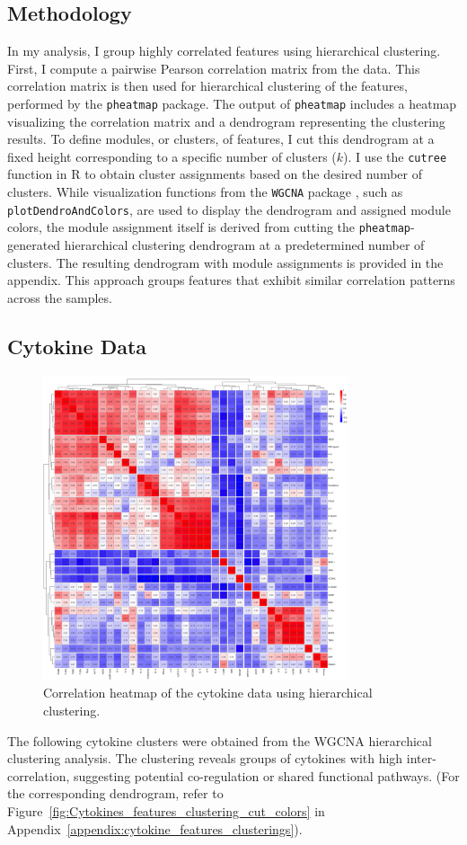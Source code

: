 \documentclass[12pt,a4paper]{report}
\begin{document}
\subsection{Methodology}
\noindent
In my analysis, I group highly correlated features using hierarchical clustering. First, I compute a pairwise Pearson correlation matrix from the data. This correlation matrix is then used for hierarchical clustering of the features, performed by the \texttt{pheatmap} package. The output of \texttt{pheatmap} includes a heatmap visualizing the correlation matrix and a dendrogram representing the clustering results. To define modules, or clusters, of features, I cut this dendrogram at a fixed height corresponding to a specific number of clusters ($k$). I use the \texttt{cutree} function in R to obtain cluster assignments based on the desired number of clusters. While visualization functions from the \texttt{WGCNA} package \cite{WGCNA}, such as \texttt{plotDendroAndColors}, are used to display the dendrogram and assigned module colors, the module assignment itself is derived from cutting the \texttt{pheatmap}-generated hierarchical clustering dendrogram at a predetermined number of clusters. The resulting dendrogram with module assignments is provided in the appendix. This approach groups features that exhibit similar correlation patterns across the samples.

\subsection{Cytokine Data}
\begin{figure}[h!]
  \centering
  \includegraphics[width=0.8\textwidth]{images/Cytokine_euclidean_distance.png}
  \caption[cytokines data correlations]{Correlation heatmap of the cytokine data using hierarchical clustering.}
  \label{fig:cytokine_heatmap}
\end{figure}
\noindent
The following cytokine clusters were obtained from the WGCNA hierarchical clustering analysis. The clustering reveals groups of cytokines with high inter-correlation, suggesting potential co-regulation or shared functional pathways. (For the corresponding dendrogram, refer to Figure~\ref{fig:Cytokines_features_clustering_cut_colors} in Appendix~\ref{appendix:cytokine_features_clusterings}).
\end{document}
